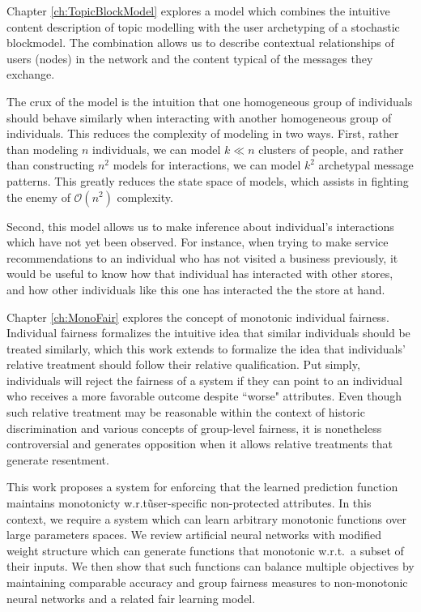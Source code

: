 Chapter \ref{ch:TopicBlockModel} explores a model which combines the intuitive content description of topic modelling with the user archetyping of a stochastic blockmodel.  The combination allows us to describe contextual relationships of users (nodes) in the network and the content typical of the messages they exchange.

The crux of the model is the intuition that one homogeneous group of individuals should behave similarly when interacting with another homogeneous group of individuals.  This reduces the complexity of modeling in two ways.  First, rather than modeling $n$ individuals, we can model $k \ll n$ clusters of people, and rather than constructing $n^2$ models for interactions, we can model $k^2$ archetypal message patterns.  This greatly reduces the state space of models, which assists in fighting the enemy of $\mathcal{O}(n^2)$ complexity.  

Second, this model allows us to make inference about individual's interactions which have not yet been observed.  For instance, when trying to make service recommendations to an individual who has not visited a business previously, it would be useful to know how that individual has interacted with other stores, and how other individuals like this one has interacted the the store at hand.



Chapter \ref{ch:MonoFair} explores the concept of monotonic individual fairness.  Individual fairness \citep{dwork2012fairness} formalizes the intuitive idea that similar individuals should be treated similarly, which this work extends to formalize the idea that individuals' relative treatment should follow their relative qualification.  Put simply, individuals will reject the fairness of a system if they can point to an individual who receives a more favorable outcome despite ``worse" attributes.  Even though such relative treatment may be reasonable within the context of historic discrimination and various concepts of group-level fairness, it is nonetheless controversial and generates opposition when it allows relative treatments that generate resentment.

This work proposes a system for enforcing that the learned prediction function maintains monotonicty w.r.t\~ user-specific non-protected attributes.  In this context, we require a system which can learn arbitrary monotonic functions over large parameters spaces.  We review artificial neural networks with modified weight structure which can generate functions that monotonic w.r.t.\ a subset of their inputs. We then show that such functions can balance multiple objectives by maintaining comparable accuracy and group fairness measures to non-monotonic neural networks and a related fair learning model.



